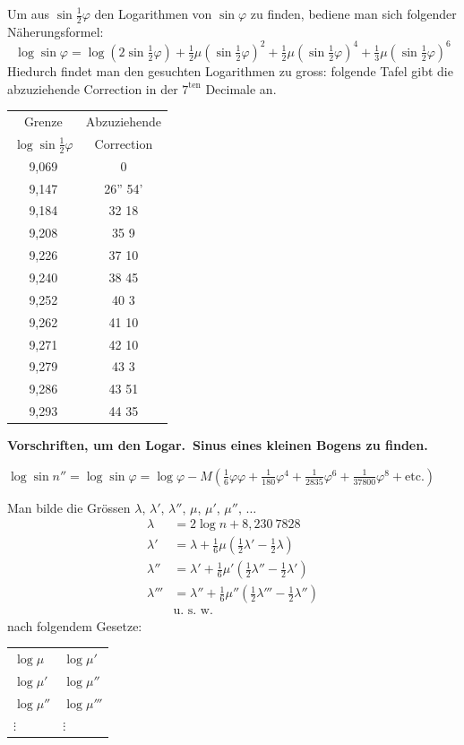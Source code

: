 \documentclass[12pt,a4paper]{article}
\begin{document}
Um aus $\sin\tfrac{1}{2}\varphi$ den Logarithmen von $\sin\varphi$ zu finden, bediene man sich
folgender N\"aherungsformel:
\[
\log\sin\varphi = \log(2\sin\tfrac{1}{2}\varphi) + \tfrac{1}{2}\mu(\sin\tfrac{1}{2}\varphi)^2 + \tfrac{1}{2}\mu(\sin\tfrac{1}{2}\varphi)^4 + \tfrac{1}{3}\mu(\sin\tfrac{1}{2}\varphi)^6
\]
Hiedurch findet man den gesuchten Logarithmen zu gross: folgende Tafel
gibt die abzuziehende Correction in der $7^{\text{ten}}$ Decimale an.

\begin{center}
\begin{tabular}{|c|c|}
\hline
Grenze & Abzuziehende \\
$\log\sin\tfrac{1}{2}\varphi$ & Correction \\
\hline
9,069 & 0 \\
9,147 & 26'' 54' \\
9,184 & 32 18 \\
9,208 & 35 9 \\
9,226 & 37 10 \\
9,240 & 38 45 \\
9,252 & 40 3 \\
9,262 & 41 10 \\
9,271 & 42 10 \\
9,279 & 43 3 \\
9,286 & 43 51 \\
9,293 & 44 35 \\
\hline
\end{tabular}
\end{center}

\newpage

\textbf{Vorschriften, um den Logar.~Sinus eines kleinen Bogens zu finden.}

$\log\sin n'' = \log\sin\varphi = \log\varphi - M(\tfrac{1}{6}\varphi\varphi + \tfrac{1}{180}\varphi^4 + \tfrac{1}{2835}\varphi^6 + \tfrac{1}{37800}\varphi^8 + \text{etc.})$

Man bilde die Gr\"ossen $\lambda$, $\lambda'$, $\lambda''$, $\mu$, $\mu'$, $\mu''$, $\ldots$
\begin{align*}
\lambda &= 2\log n + 8{,}230\ 7828 \\
\lambda' &= \lambda + \tfrac{1}{6}\mu(\tfrac{1}{2}\lambda' - \tfrac{1}{2}\lambda) \\
\lambda'' &= \lambda' + \tfrac{1}{6}\mu'(\tfrac{1}{2}\lambda'' - \tfrac{1}{2}\lambda') \\
\lambda''' &= \lambda'' + \tfrac{1}{6}\mu''(\tfrac{1}{2}\lambda''' - \tfrac{1}{2}\lambda'') \\
&\text{u.~s.~w.}
\end{align*}
nach folgendem Gesetze:
\begin{center}
\begin{tabular}{ll}
$\log\mu$ & $\log\mu'$ \\
$\log\mu'$ & $\log\mu''$ \\
$\log\mu''$ & $\log\mu'''$ \\
$\vdots$ & $\vdots$
\end{tabular}
\end{center}
\end{document}
